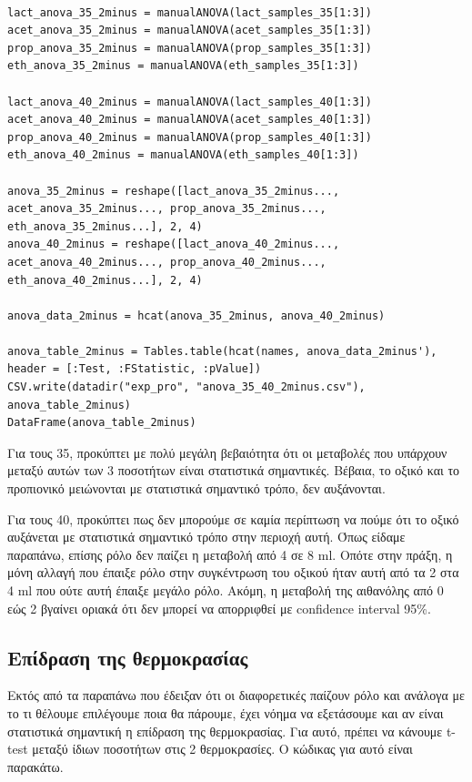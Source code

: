 \documentclass[11pt]{article}
\begin{document}
\begin{verbatim}

lact_anova_35_2minus = manualANOVA(lact_samples_35[1:3])
acet_anova_35_2minus = manualANOVA(acet_samples_35[1:3])
prop_anova_35_2minus = manualANOVA(prop_samples_35[1:3])
eth_anova_35_2minus = manualANOVA(eth_samples_35[1:3])

lact_anova_40_2minus = manualANOVA(lact_samples_40[1:3])
acet_anova_40_2minus = manualANOVA(acet_samples_40[1:3])
prop_anova_40_2minus = manualANOVA(prop_samples_40[1:3])
eth_anova_40_2minus = manualANOVA(eth_samples_40[1:3])

anova_35_2minus = reshape([lact_anova_35_2minus..., acet_anova_35_2minus..., prop_anova_35_2minus..., eth_anova_35_2minus...], 2, 4)
anova_40_2minus = reshape([lact_anova_40_2minus..., acet_anova_40_2minus..., prop_anova_40_2minus..., eth_anova_40_2minus...], 2, 4)

anova_data_2minus = hcat(anova_35_2minus, anova_40_2minus)

anova_table_2minus = Tables.table(hcat(names, anova_data_2minus'), header = [:Test, :FStatistic, :pValue])
CSV.write(datadir("exp_pro", "anova_35_40_2minus.csv"), anova_table_2minus)
DataFrame(anova_table_2minus)

\end{verbatim}

Για τους 35, προκύπτει με πολύ μεγάλη βεβαιότητα ότι οι μεταβολές που υπάρχουν μεταξύ αυτών των 3 ποσοτήτων είναι στατιστικά σημαντικές. Βέβαια, το οξικό και το προπιονικό μειώνονται με στατιστικά σημαντικό τρόπο, δεν αυξάνονται.

Για τους 40, προκύπτει πως δεν μπορούμε σε καμία περίπτωση να πούμε ότι το οξικό αυξάνεται με στατιστικά σημαντικό τρόπο στην περιοχή αυτή. Όπως είδαμε παραπάνω, επίσης ρόλο δεν παίζει η μεταβολή από 4 σε 8 ml. Οπότε στην πράξη, η μόνη αλλαγή που έπαιξε ρόλο στην συγκέντρωση του οξικού ήταν αυτή από τα 2 στα 4 ml που ούτε αυτή έπαιξε μεγάλο ρόλο. Ακόμη, η μεταβολή της αιθανόλης από 0 εώς 2 βγαίνει οριακά ότι δεν μπορεί να απορριφθεί με confidence interval 95\%.

\subsection{Επίδραση της θερμοκρασίας}
\label{sec:orge35eeab}
Εκτός από τα παραπάνω που έδειξαν ότι οι διαφορετικές παίζουν ρόλο και ανάλογα με το τι θέλουμε επιλέγουμε ποια θα πάρουμε, έχει νόημα να εξετάσουμε και αν είναι στατιστικά σημαντική η επίδραση της θερμοκρασίας. Για αυτό, πρέπει να κάνουμε t-test μεταξύ ίδιων ποσοτήτων στις 2 θερμοκρασίες. Ο κώδικας για αυτό είναι παρακάτω.
\end{document}
